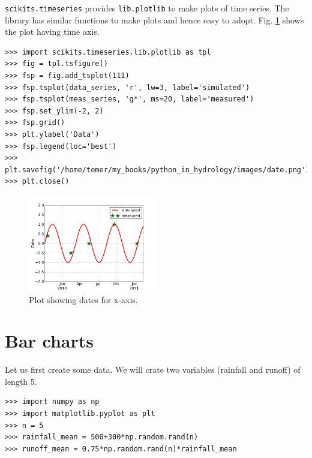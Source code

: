 \documentclass[10pt]{book}
\begin{document}
\verb"scikits.timeseries" provides \verb"lib.plotlib" to make plots of time series. The library has similar functions to make plots  and hence easy to adopt. Fig. \ref{fig:date} shows the plot having time axis. 

\beforeverb \begin{verbatim}
>>> import scikits.timeseries.lib.plotlib as tpl
>>> fig = tpl.tsfigure()
>>> fsp = fig.add_tsplot(111)
>>> fsp.tsplot(data_series, 'r', lw=3, label='simulated')
>>> fsp.tsplot(meas_series, 'g*', ms=20, label='measured')
>>> fsp.set_ylim(-2, 2)
>>> fsp.grid()
>>> plt.ylabel('Data')
>>> fsp.legend(loc='best')
>>> plt.savefig('/home/tomer/my_books/python_in_hydrology/images/date.png')
>>> plt.close()
\end{verbatim} \afterverb

\beforefig
\begin{figure}[h!]
  \centering
    \includegraphics[width=0.5\textwidth]{images/date.png}
  \caption{Plot showing dates for x-axis.}
   \label{fig:date}
\end{figure}
\afterfig

\section{Bar charts}
Let us first create some data. We will crate two variables (rainfall and runoff) of length 5. 
\beforeverb \begin{verbatim}
>>> import numpy as np
>>> import matplotlib.pyplot as plt
>>> n = 5
>>> rainfall_mean = 500+300*np.random.rand(n)
>>> runoff_mean = 0.75*np.random.rand(n)*rainfall_mean
\end{verbatim} \afterverb
\end{document}

